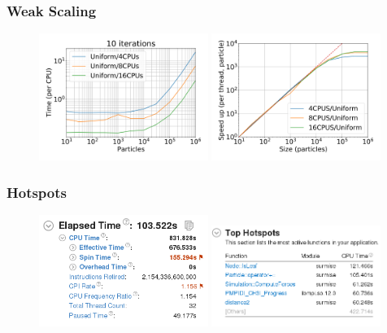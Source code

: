 \begin{frame}
	\frametitle{Weak Scaling}
	\begin{figure}
		\centering
		\includegraphics[width=0.49\textwidth]{inclfigs/weak_time.png}
		\includegraphics[width=0.49\textwidth]{inclfigs/weak_speedup.png}
	\end{figure}
\end{frame}

\begin{frame}
	\frametitle{Hotspots}
	\begin{figure}
		\centering
		\includegraphics[width=0.49\textwidth]{inclfigs/par-spintime.png}
		\includegraphics[width=0.49\textwidth]{inclfigs/par-hotspots.png}
	\end{figure}
\end{frame}

